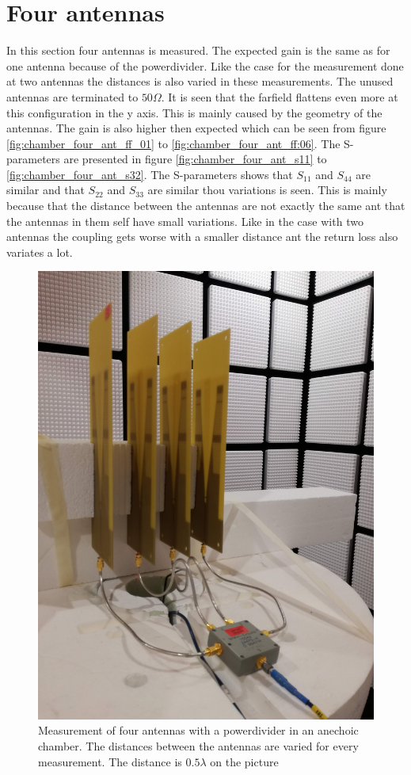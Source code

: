 \section{Four antennas}
In this section four antennas is measured. The expected gain is the same as for one antenna because of the powerdivider. Like the case for the measurement done at two antennas the distances is also varied in these measurements. The unused antennas are terminated to $50\Omega$. It is seen that the farfield flattens even more at this configuration in the y axis. This is mainly caused by the geometry of the antennas. The gain is also higher then expected which can be seen from figure \ref{fig:chamber_four_ant_ff_01} to \ref{fig:chamber_four_ant_ff:06}. The S-parameters are presented in figure  \ref{fig:chamber_four_ant_s11} to \ref{fig:chamber_four_ant_s32}. The S-parameters shows that $S_{11}$ and $S_{44}$ are similar and that $S_{22}$ and $S_{33}$ are similar thou variations is seen. This is mainly because that the distance between the antennas are not exactly the same ant that the antennas in them self have small variations. Like in the case with two antennas the coupling gets worse with a smaller distance ant the return loss also variates a lot. 

\begin{figure}[H]
\centering 
\includegraphics[scale = 0.05]{figures/measurement/antennas/four_ant.jpg}
\caption{Measurement of four antennas with a powerdivider in an anechoic chamber. The distances between the antennas are varied for every measurement. The distance is $0.5\lambda$ on the picture}
\label{fig:chamber_four_ant}
\end{figure} 


